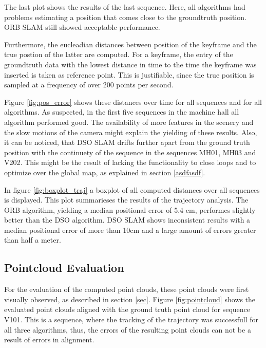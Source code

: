 	The last plot shows the results of the last sequence. Here, all algorithms had problems estimating a position that comes close to the groundtruth position. ORB
	SLAM still showed acceptable performance. 
	
	
	Furthermore, the eucleadian distances between position of the keyframe and the true postion of the latter are computed. For a keyframe, 
	the entry of the groundtruth data with the lowest distance in time to the time the keyframe was inserted is taken as reference point. 
	This is justifiable, since the true position is sampled at a frequency of over 200 points per second. 
	
	Figure \ref{fig:pos_error} shows these distances over time for all sequences and for all algorithms. As suspected, in the first five sequences in the machine 
	hall all algorithm performed good. The availability of more features in the scenery and the slow motions of the camera might explain the yielding of these results. 
	Also, it can be noticed, that DSO SLAM drifts further apart from the ground truth position with the continuety of the sequence in the sequences MH01, MH03 and V202. 
	This might be the result of lacking the functionality to close loops and to optimize over the global map, as explained in section \ref{asdfasdf}. 
	
	In figure \ref{fig:boxplot_traj} a boxplot of all computed distances over all sequences is displayed. This plot summarieses the results of the 
	trajectory analysis. The ORB algorithm, yielding a median positional error of 5.4 cm, performes slightly better than the DSO algorithm. DSO SLAM 
	shows inconsistent results with a median positional error of more than 10cm and a large amount of errors greater than half a meter. 
	
	
	
\subsection{Pointcloud Evaluation}

For the evaluation of the computed point clouds, these point clouds were first visually observed, as described in section \ref{sec}. 
Figure \ref{fig:pointcloud} shows the evaluated point clouds aligned with the ground truth point cloud for sequence V101. This is a sequence, 
where the tracking of the trajectory was successfull for all three algorithms, thus, the errors of the resulting point clouds can not 
be a result of errors in alignment. 

